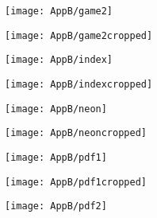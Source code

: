 \documentclass[draft,final]{vutinfth} %
\begin{document}
\begin{appendices}
\begin{figure}[H]
\begin{subfigure}[b]{0.45\columnwidth}
			\end{subfigure}
		\end{figure}    
		\begin{figure}[H]
			\centering
			\begin{subfigure}[b]{0.45\columnwidth}
				\centering
				\texttt{[image: AppB/game2]}
			\end{subfigure}
			\begin{subfigure}[b]{0.45\columnwidth}
				\centering
				\texttt{[image: AppB/game2cropped]}
			\end{subfigure}
		\end{figure}
		\begin{figure}[H]
			\centering
			\begin{subfigure}[b]{0.45\columnwidth}
				\centering
				\texttt{[image: AppB/index]}
			\end{subfigure}
			\begin{subfigure}[b]{0.45\columnwidth}
				\centering
				\texttt{[image: AppB/indexcropped]}
			\end{subfigure}
		\end{figure}    
		\begin{figure}[H]
			\centering
			\begin{subfigure}[b]{0.45\columnwidth}
				\centering
				\texttt{[image: AppB/neon]}
			\end{subfigure}
			\begin{subfigure}[b]{0.45\columnwidth}
				\centering
				\texttt{[image: AppB/neoncropped]}
			\end{subfigure}
		\end{figure} 
		\begin{figure}[H]
			\centering
			\begin{subfigure}[b]{0.45\columnwidth}
				\centering
				\texttt{[image: AppB/pdf1]}
			\end{subfigure}
			\begin{subfigure}[b]{0.45\columnwidth}
				\centering
				\texttt{[image: AppB/pdf1cropped]}
			\end{subfigure}
		\end{figure}   
		\begin{figure}[H]
			\centering
			\begin{subfigure}[b]{0.45\columnwidth}
				\centering
				\texttt{[image: AppB/pdf2]}
			\end{subfigure}

\end{figure}
\end{appendices}
\end{document}
